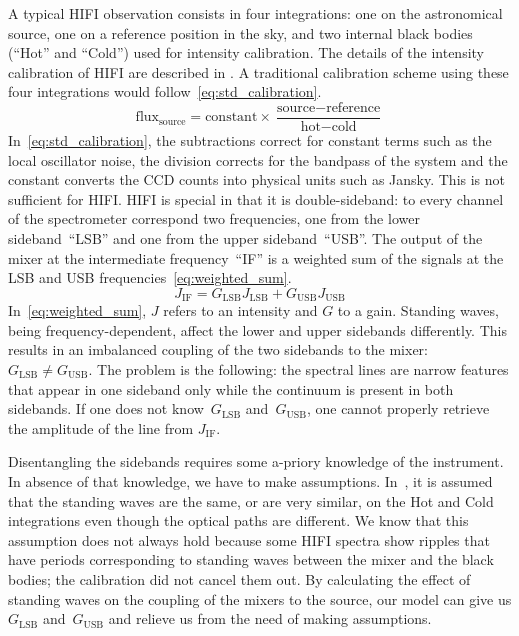 \documentclass[journal]{IEEEtran}
\begin{document}
A typical HIFI observation consists in four integrations: one on the astronomical source, one on a reference position in the sky, and two internal black bodies (``Hot'' and ``Cold'') used for intensity calibration.
The details of the intensity calibration of HIFI are described in \cite{ossenkopf2002intensity}.
A traditional calibration scheme using these four integrations would follow~\eqref{eq:std_calibration}.
\begin{equation}
    \text{flux}_\text{source} = 
    \text{constant}
    \times
    \frac{\text{source} - \text{reference}}{\text{hot} - \text{cold}}
    \label{eq:std_calibration}
\end{equation}
In~\eqref{eq:std_calibration}, the subtractions correct for constant terms such as the local oscillator noise, the division corrects for the bandpass of the system and the constant converts the CCD counts into physical units such as Jansky.
This is not sufficient for HIFI.
HIFI is special in that it is double-sideband: to every channel of the spectrometer correspond two frequencies, one from the lower sideband~``LSB'' and one from the upper sideband~``USB''.
The output of the mixer at the intermediate frequency~``IF'' is a weighted sum of the signals at the LSB and USB frequencies~\eqref{eq:weighted_sum}.
\begin{equation}
    J_\text{IF} = G_\text{LSB} J_\text{LSB} + G_\text{USB} J_\text{USB}
    \label{eq:weighted_sum}
\end{equation}
In~\eqref{eq:weighted_sum}, $J$ refers to an intensity and $G$ to a gain.
Standing waves, being frequency-dependent, affect the lower and upper sidebands differently.
This results in an imbalanced coupling of the two sidebands to the mixer: $G_\text{LSB} \neq G_\text{USB}$.
The problem is the following: the spectral lines are narrow features that appear in one sideband only while the continuum is present in both sidebands.
If one does not know~$G_\text{LSB}$ and~$G_\text{USB}$, one cannot properly retrieve the amplitude of the line from $J_\text{IF}$.

Disentangling the sidebands requires some a-priory knowledge of the instrument.
In absence of that knowledge, we have to make assumptions.
In~\cite{ossenkopf2002intensity}, it is assumed that the standing waves are the same, or are very similar, on the Hot and Cold integrations even though the optical paths are different.
We know that this assumption does not always hold because some HIFI spectra show ripples that have periods corresponding to standing waves between the mixer and the black bodies; the calibration did not cancel them out.
By calculating the effect of standing waves on the coupling of the mixers to the source, our model can give us $G_\text{LSB}$ and~$G_\text{USB}$ and relieve us from the need of making assumptions.
\end{document}
